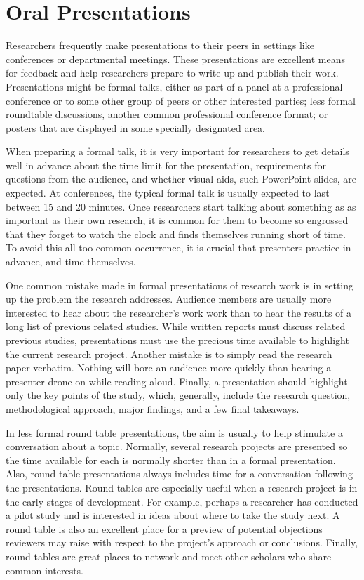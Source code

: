 \section{Oral Presentations}

Researchers frequently make presentations to their peers in settings like conferences or departmental meetings. These presentations are excellent means for feedback and help researchers prepare to write up and publish their work. Presentations might be formal talks, either as part of a panel at a professional conference or to some other group of peers or other interested parties; less formal roundtable discussions, another common professional conference format; or posters that are displayed in some specially designated area.

When preparing a formal talk, it is very important for researchers to get details well in advance about the time limit for the presentation, requirements for questions from the audience, and whether visual aids, such PowerPoint slides, are expected. At conferences, the typical formal talk is usually expected to last between 15 and 20 minutes. Once researchers start talking about something as as important as their own research, it is common for them to become so engrossed that they forget to watch the clock and finds themselves running short of time. To avoid this all-too-common occurrence, it is crucial that presenters practice in advance, and time themselves.

One common mistake made in formal presentations of research work is in setting up the problem the research addresses. Audience members are usually more interested to hear about the researcher's work work than to hear the results of a long list of previous related studies. While written reports must discuss related previous studies, presentations must use the precious time available to highlight the current research project. Another mistake is to simply read the research paper verbatim. Nothing will bore an audience more quickly than hearing a presenter drone on while reading aloud. Finally, a presentation should highlight only the key points of the study, which, generally, include the research question, methodological approach, major findings, and a few final takeaways.

In less formal round table presentations, the aim is usually to help stimulate a conversation about a topic. Normally, several research projects are presented so the time available for each is normally shorter than in a formal presentation. Also, round table presentations always includes time for a conversation following the presentations. Round tables are especially useful when a research project is in the early stages of development. For example, perhaps a researcher has conducted a pilot study and is interested in ideas about where to take the study next. A round table is also an excellent place for a preview of potential objections reviewers may raise with respect to the project's approach or conclusions. Finally, round tables are great places to network and meet other scholars who share common interests.

